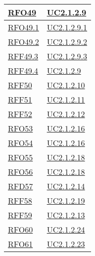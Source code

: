 \begin{longtable}{|>{\centering}m{5cm}|m{5cm}<{\centering}|}
	\hyperlink{RFO49}{RFO49} & \hyperref[UC2.1.2.9]{UC2.1.2.9}\\ \hline
	
	\hyperlink{RFO49.1}{RFO49.1} & \hyperref[UC2.1.2.9.1]{UC2.1.2.9.1}\\ \hline
	
	\hyperlink{RFO49.2}{RFO49.2} & \hyperref[UC2.1.2.9.2]{UC2.1.2.9.2}\\ \hline
	
	\hyperlink{RFF49.3}{RFF49.3} & \hyperref[UC2.1.2.9.3]{UC2.1.2.9.3}\\ \hline
	
	\hyperlink{RFF49.4}{RFF49.4} & \hyperref[UC2.1.2.9]{UC2.1.2.9}\\ \hline
	
	\hyperlink{RFF50}{RFF50} & \hyperref[UC2.1.2.10]{UC2.1.2.10}\\ \hline
	
	\hyperlink{RFF51}{RFF51} & \hyperref[UC2.1.2.11]{UC2.1.2.11}\\ \hline
	
	\hyperlink{RFF52}{RFF52} & \hyperref[UC2.1.2.12]{UC2.1.2.12}\\ \hline
	
	\hyperlink{RFO53}{RFO53} & \hyperref[UC2.1.2.16]{UC2.1.2.16}\\ \hline
	
	\hyperlink{RFO54}{RFO54} & \hyperref[UC2.1.2.16]{UC2.1.2.16}\\ \hline
	
	\hyperlink{RFO55}{RFO55} & \hyperref[UC2.1.2.18]{UC2.1.2.18}\\ \hline
	
	\hyperlink{RFO56}{RFO56} & \hyperref[UC2.1.2.18]{UC2.1.2.18}\\ \hline
	
	\hyperlink{RFD57}{RFD57} & \hyperref[UC2.1.2.14]{UC2.1.2.14}\\ \hline
	
	\hyperlink{RFF58}{RFF58} & \hyperref[UC2.1.2.19]{UC2.1.2.19}\\ \hline
	
	\hyperlink{RFF59}{RFF59} & \hyperref[UC2.1.2.13]{UC2.1.2.13}\\ \hline
	
	\hyperlink{RFO60}{RFO60} & \hyperref[UC2.1.2.24]{UC2.1.2.24}\\ \hline
	
	\hyperlink{RFO61}{RFO61} & \hyperref[UC2.1.2.23]{UC2.1.2.23}\\ \hline
	

\end{longtable}
